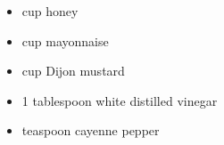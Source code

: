 \begin{itemize}
  \item {} cup honey
  \item {} cup mayonnaise
  \item {} cup Dijon mustard
  \item 1 tablespoon white distilled vinegar
  \item {} teaspoon cayenne pepper
\end{itemize}
